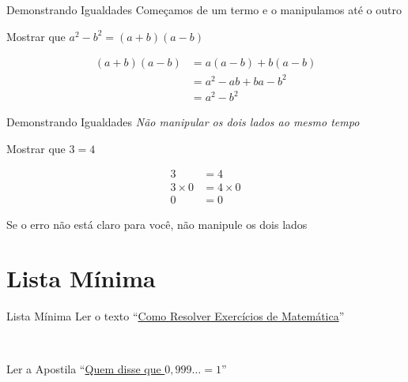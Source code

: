 \begin{frame}{Demonstrando Igualdades}
  Começamos de um termo e o manipulamos até o outro

  \pause
  \vspace{\baselineskip}
  Mostrar que \(a^2-b^2 = (a+b)(a-b)\)

  \pause
  \begin{align*}
    (a+b)(a-b)
    & = a(a-b) + b(a-b) \\
    & = a^2 - ab + ba - b^2 \\
    & = a^2 - b^2
  \end{align*}
\end{frame}

\begin{frame}{Demonstrando Igualdades}
  \emph{Não manipular os dois lados ao mesmo tempo}

  \pause
  \vspace{\baselineskip}
  Mostrar que \(3=4\)

  \pause
  \begin{align*}
    3          & = 4          \\
    3 \times 0 & = 4 \times 0 \\
    0          & = 0
  \end{align*}

  \pause
  Se o erro não está claro para você, não manipule os dois lados
\end{frame}

\section{Lista Mínima}

\begin{frame}{Lista Mínima}
  Ler o texto
  ``\href{https://drive.google.com/file/d/1iUuy68VWqKabrV7JxTwlyOgr59cA9G2r/view?usp=sharing}%
  {Como Resolver Exercícios de Matemática}''

  ~

  Ler a Apostila
  ``\href{https://sites.google.com/view/prof-luis-dafonseca/ensino-b\%C3\%A1sico/infinito}%
  {Quem disse que $0,999\dots=1$}''
\end{frame}


